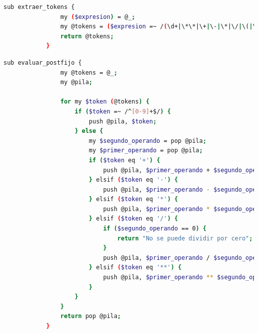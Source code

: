 \documentclass{article}
\begin{document}
        \begin{lstlisting}[language=bash,caption={En esta sección divide la expresión matemática en tokens, como números y operadores, usando una expresión regular que identifica patrones específicos.}, label={lst:color-boton}]
            sub extraer_tokens {
                my ($expresion) = @_;
                my @tokens = ($expresion =~ /(\d+|\*\*|\+|\-|\*|\/|\(|\))/g);
                return @tokens;
            }

        \end{lstlisting}

        \begin{lstlisting}[language=bash,caption={Aquí se evalúan los tokens de la expresión en notación postfija, utilizando una expresión regular para identificar números, lo que permite manipular la pila y realizar las operaciones.}, label={lst:color-boton}]
            sub evaluar_postfijo {
                my @tokens = @_;
                my @pila;
            
                for my $token (@tokens) {
                    if ($token =~ /^[0-9]+$/) {
                        push @pila, $token;
                    } else {
                        my $segundo_operando = pop @pila;
                        my $primer_operando = pop @pila;
                        if ($token eq '+') {
                            push @pila, $primer_operando + $segundo_operando;
                        } elsif ($token eq '-') {
                            push @pila, $primer_operando - $segundo_operando;
                        } elsif ($token eq '*') {
                            push @pila, $primer_operando * $segundo_operando;
                        } elsif ($token eq '/') {
                            if ($segundo_operando == 0) {
                                return "No se puede dividir por cero";
                            }
                            push @pila, $primer_operando / $segundo_operando;
                        } elsif ($token eq '**') {
                            push @pila, $primer_operando ** $segundo_operando;
                        }
                    }
                }
                return pop @pila;
            }

        \end{lstlisting}
\end{document}

